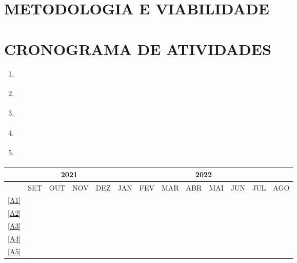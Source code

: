 \documentclass[
	article,			%
	12pt,				%
	oneside,			%
	a4paper,			%
	section=TITLE,		%
	subsection=TITLE,	%
	english,			%
	brazil,				%
	sumario=tradicional
	]{abntex2}
\begin{document}
\section{METODOLOGIA E VIABILIDADE}


\section{CRONOGRAMA DE ATIVIDADES}

    \begin{enumerate}
    	\item \label{A1} 
    	\item \label{A2} 
         \item \label{A3}  
         \item \label{A4} 
         \item \label{A5} 
    \end{enumerate}
    
    \begin{table}[!htb]
    	\centering
    		\begin{tabular}{|c|c|c|c|c|c|c|c|c|c|c|c|c|}
    		\hline
    		&\multicolumn{4}{c|}{2021}&\multicolumn{8}{c|}{2022}\\
    		\hline
    		&SET&OUT&NOV&DEZ&JAN&FEV&MAR&ABR&MAI&JUN&JUL&AGO\\
    		\hline
    		\ref{A1}&\cellcolor{blue}&\cellcolor{blue}&\cellcolor{blue}&&&&&&&&&\\
    		\hline
    		\ref{A2}&&&&\cellcolor{blue}&\cellcolor{blue}&\cellcolor{blue}&&&&&&\\
    		\hline
    		\ref{A3}&&&&\cellcolor{blue}&\cellcolor{blue}&\cellcolor{blue}&&&&&&\\
    		\hline
    		\ref{A4}&&&&&&&\cellcolor{blue}&\cellcolor{blue}&\cellcolor{blue}&\cellcolor{blue}&\cellcolor{blue}&\cellcolor{blue}\\
    		\hline
    		\ref{A5}&&&&&&&\cellcolor{blue}&\cellcolor{blue}&\cellcolor{blue}&\cellcolor{blue}&\cellcolor{blue}&\cellcolor{blue}\\
    		\bottomrule
    		\end{tabular}
    \end{table}


\postextual
\newpage

\end{document}
